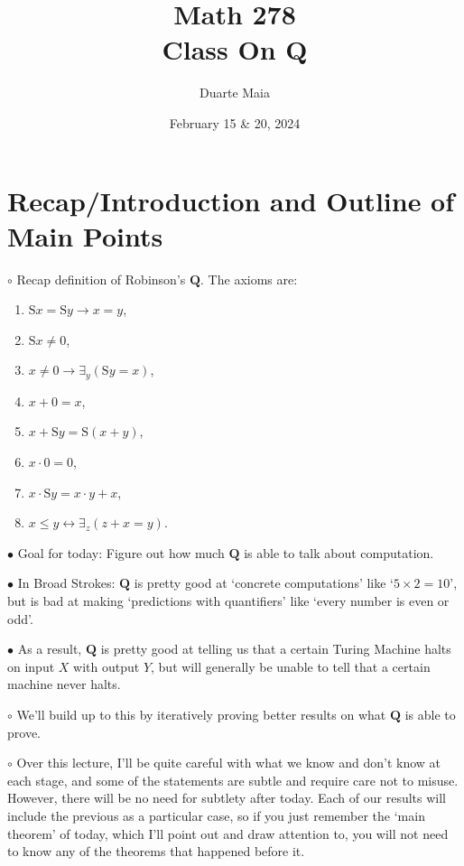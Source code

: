 \documentclass{article}
\title{Math 278\\Class On Q}
\author{Duarte Maia}
\date{February 15 \& 20, 2024}
\newcommand{\RQ}{\mathbf{Q}}
\newcommand{\suc}{\mathrm{S}}
\newcommand\Point[1]{\noindent \hspace{\labelsep} {
$\bullet$ #1} \smallskip}
\newcommand\point[1]{\noindent \hspace{\labelsep} {\small $\circ$ #1} \smallskip}
\begin{document}
\maketitle

\section{Recap/Introduction and Outline of Main Points}

\point{Recap definition of Robinson's $\RQ$. The axioms are:
\begin{enumerate}[label=\arabic*., itemsep=0em, ref=\arabic*]
\item\label{ax:1} $\suc x = \suc y \rightarrow x=y$,
\item\label{ax:2} $\suc x \neq 0$,
\item\label{ax:3} $x \neq 0 \rightarrow \exists_y(\suc y = x)$,
\item\label{ax:4} $x+0 = x$,
\item\label{ax:5} $x + \suc y = \suc(x+y)$,
\item\label{ax:6} $x \cdot 0 = 0$,
\item\label{ax:7} $x \cdot \suc y = x\cdot y + x$,
\item\label{ax:8} $x \leq y \leftrightarrow \exists_z (z+x = y)$.
\end{enumerate}}

\Point{Goal for today: Figure out how much $\RQ$ is able to talk about computation.}

\Point{In Broad Strokes: $\RQ$ is pretty good at `concrete computations' like `$5 \times 2 = 10$', but is bad at making `predictions with quantifiers' like `every number is even or odd'.}

\Point{As a result, $\RQ$ is pretty good at telling us that a certain Turing Machine halts on input $X$ with output $Y$, but will generally be unable to tell that a certain machine never halts.}

\point{We'll build up to this by iteratively proving better results on what $\RQ$ is able to prove.}

\point{Over this lecture, I'll be quite careful with what we know and don't know at each stage, and some of the statements are subtle and require care not to misuse. However, there will be no need for subtlety after today. Each of our results will include the previous as a particular case, so if you just remember the `main theorem' of today, which I'll point out and draw attention to, you will not need to know any of the theorems that happened before it.}
\end{document}
